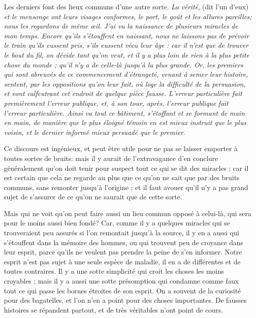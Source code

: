 Les derniers font des lieux communs d'une autre sorte. \emph{La vérité}, (dit l'un d'eux) \emph{et le mensonge ont leurs visages conformes, le port, le goût et les allures pareilles; nous les regardons de même œil. J'ai vu la naissance de plusieurs miracles de mon temps. Encore qu'ils s'étouffent en naissant, nous ne laissons pas de prévoir le train qu'ils eussent pris, s'ils eussent vécu leur âge : car il n'est que de trouver le bout du fil, on dévide tant qu'on veut, et il y a plus loin de rien à la plus petite chose du monde ; qu'il n'y a de celle-là jusqu'à la plus grande. Or, les premiers qui sont abreuvés de ce commencement d'étrangeté, venant à semer leur histoire, sentent, par les oppositions qu'on leur fait, où loge la difficulté de la persuasion, et vont calfeutrant cet endroit de quelque pièce fausse. L'erreur particulière fait premièrement l'erreur publique, et, à son tour, après, l'erreur publique fait l'erreur particulière. Ainsi va tout ce bâtiment, s'étoffant et se formant de main en main, de manière que le plus éloigné témoin en est mieux instruit que le plus voisin, et le dernier informé mieux persuadé que le premier}.

Ce discours est ingénieux, et peut être utile pour ne pas se laisser emporter à toutes sortes de bruits: mais il y aurait de l'extravagance d'en conclure généralement qu'on doit tenir pour suspect tout ce qui se dit des miracles ; car il est certain que cela ne regarde au plus que ce qu'on ne sait que par des bruits communs, sans remonter jusqu'à l'origine ; et il faut avouer qu'il n'y a pas grand sujet de s'assurer de ce qu'on ne saurait que de cette sorte.

Mais qui ne voit qu'on peut faire aussi un lieu commun opposé à celui-là, qui sera pour le moins aussi bien fondé? Car, comme il y a quelques miracles qui se trouveraient peu assurés si l'on remontait jusqu'à la source, il y en a aussi qui s'étouffent dans la mémoire des hommes, ou qui trouvent peu de croyance dans leur esprit, parce qu'ils ne veulent pas prendre la peine de s'en informer. Notre esprit n'est pas sujet à une seule espèce de maladie, il en a de différentes et de toutes contraires. Il y a une sotte simplicité qui croit les choses les moins croyables ; mais il y a aussi une sotte présomption qui condamne comme faux tout ce qui passe les bornes étroites de son esprit. On a souvent de la curiosité pour des bagatelles, et l'on n'en a point pour des choses importantes. De fausses histoires se répandent partout, et de très véritables n'ont point de cours.

